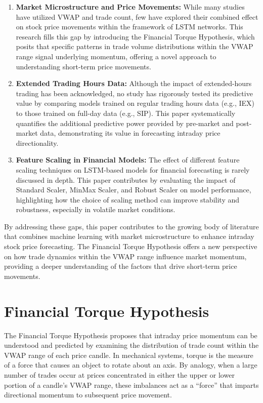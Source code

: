 \documentclass[letterpaper]{article}
\begin{document}
\begin{enumerate}
    \item \textbf{Market Microstructure and Price Movements:} While many studies have utilized VWAP and trade count, few have explored their combined effect on stock price movements within the framework of LSTM networks. This research fills this gap by introducing the Financial Torque Hypothesis, which posits that specific patterns in trade volume distributions within the VWAP range signal underlying momentum, offering a novel approach to understanding short-term price movements.
    
    \item \textbf{Extended Trading Hours Data:} Although the impact of extended-hours trading has been acknowledged, no study has rigorously tested its predictive value by comparing models trained on regular trading hours data (e.g., IEX) to those trained on full-day data (e.g., SIP). This paper systematically quantifies the additional predictive power provided by pre-market and post-market data, demonstrating its value in forecasting intraday price directionality.
    
    \item \textbf{Feature Scaling in Financial Models:} The effect of different feature scaling techniques on LSTM-based models for financial forecasting is rarely discussed in depth. This paper contributes by evaluating the impact of Standard Scaler, MinMax Scaler, and Robust Scaler on model performance, highlighting how the choice of scaling method can improve stability and robustness, especially in volatile market conditions.

\end{enumerate}

By addressing these gaps, this paper contributes to the growing body of literature that combines machine learning with market microstructure to enhance intraday stock price forecasting. The Financial Torque Hypothesis offers a new perspective on how trade dynamics within the VWAP range influence market momentum, providing a deeper understanding of the factors that drive short-term price movements.

\section{Financial Torque Hypothesis}

The Financial Torque Hypothesis proposes that intraday price momentum can be understood and predicted by examining the distribution of trade count within the VWAP range of each price candle. In mechanical systems, torque is the measure of a force that causes an object to rotate about an axis. By analogy, when a large number of trades occur at prices concentrated in either the upper or lower portion of a candle’s VWAP range, these imbalances act as a “force” that imparts directional momentum to subsequent price movement.
\end{document}
